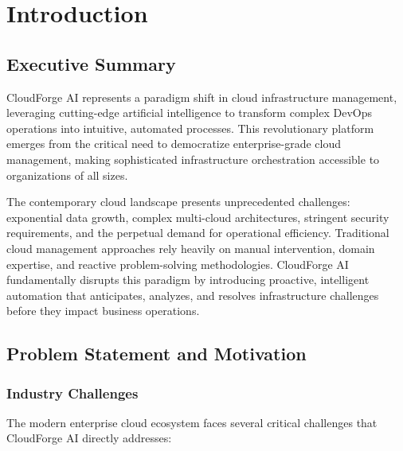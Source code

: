 \chapter{Introduction}

\section{Executive Summary}

CloudForge AI represents a paradigm shift in cloud infrastructure management, leveraging cutting-edge artificial intelligence to transform complex DevOps operations into intuitive, automated processes. This revolutionary platform emerges from the critical need to democratize enterprise-grade cloud management, making sophisticated infrastructure orchestration accessible to organizations of all sizes.

The contemporary cloud landscape presents unprecedented challenges: exponential data growth, complex multi-cloud architectures, stringent security requirements, and the perpetual demand for operational efficiency. Traditional cloud management approaches rely heavily on manual intervention, domain expertise, and reactive problem-solving methodologies. CloudForge AI fundamentally disrupts this paradigm by introducing proactive, intelligent automation that anticipates, analyzes, and resolves infrastructure challenges before they impact business operations.

\section{Problem Statement and Motivation}

\subsection{Industry Challenges}

The modern enterprise cloud ecosystem faces several critical challenges that CloudForge AI directly addresses:

